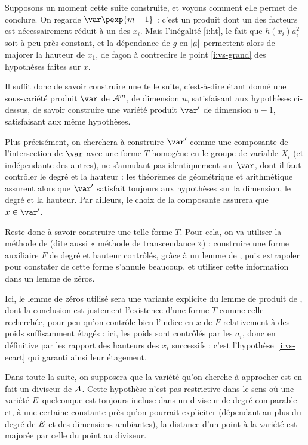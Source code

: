 Supposons un moment cette suite construite, et voyons comment elle permet de
conclure. On regarde $\var\pexp{m-1}$ : c'est un produit dont un des facteurs est
nécessairement réduit à un des $x_i$. Mais l'inégalité \ref{i:ht}, le fait que
$h(x_i)a_i^2$ soit à peu près constant, et la dépendance de $g$ en $\lvert a\rvert$
permettent alors de majorer la hauteur de $x_1$, de façon à contredire le
point \ref{i:vs-grand} des hypothèses faites sur $x$.

Il suffit donc de savoir construire une telle suite, c'est-à-dire étant donné
une sous-variété produit $\var$ de $\mathcal A^m$, de dimension $u$, satisfaisant aux
hypothèses ci-dessus, de savoir construire une variété produit $\var'$ de
dimension $u-1$, satisfaisant aux même hypothèses.

Plus précisément, on cherchera à construire $\var'$ comme une composante de
l'intersection de $\var$ avec une forme $T$ homogène en le groupe de variable
$X_i$ (et indépendante des autres), ne s'annulant pas identiquement sur $\var$,
dont il faut contrôler le degré et la hauteur : les théorèmes de 
géométrique et arithmétique assurent alors que $\var'$ satisfait toujours aux
hypothèses sur la dimension, le degré et la hauteur. Par ailleurs, le choix de
la composante assurera que $x \in \var'$.

Reste donc à savoir construire une telle forme $T$. Pour cela, on va utiliser
la méthode de  (dite aussi « méthode de transcendance ») :
construire une forme auxiliaire $F$ de degré et hauteur contrôlés, grâce à un
lemme de , puis extrapoler pour constater de cette forme s'annule
beaucoup, et utiliser cette information dans un lemme de zéros.

Ici, le lemme de zéros utilisé sera une variante explicite du lemme de produit
de , dont la conclusion est justement l'existence d'une forme
$T$ comme celle recherchée, pour peu qu'on contrôle bien l'indice en $x$ de
$F$ relativement à des poids suffisamment étagés : ici, les poids sont
contrôlés par les $a_i$, donc en définitive par les rapport des hauteurs des
$x_i$ successifs : c'est l'hypothèse~\ref{i:vs-ecart} qui garanti ainsi leur
étagement.

Dans toute la suite, on supposera que la variété qu'on cherche à approcher est
en fait un diviseur de $\mathcal A$. Cette hypothèse n'est pas restrictive dans le
sens où une variété $E$ quelconque est toujours incluse dans un diviseur de
degré comparable et, à une certaine constante près qu'on pourrait expliciter
(dépendant au plus du degré de $E$ et des dimensions ambiantes), la distance
d'un point à la variété est majorée par celle du point au diviseur.

